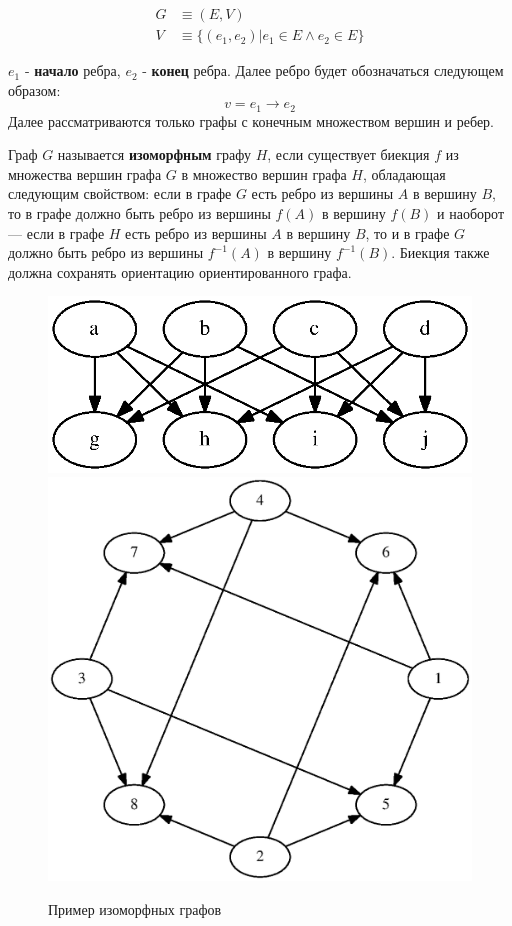 \documentclass[russian,utf8,emptystyle]{eskdtext}
\begin{document}
\begin{spacing}{1.5}
\begin{align*}
G &\equiv ( E, V ) \\ 
V &\equiv \{ (e_1, e_2) | e_1 \in E \wedge e_2 \in E \}
\end{align*}

$e_1$ - \textbf{начало} ребра, $e_2$ - \textbf{конец} ребра. Далее ребро будет обозначаться следующем образом:
$$
v = e_1 \rightarrow e_2
$$
Далее рассматриваются только графы с конечным множеством вершин и ребер.

Граф $G$ называется \textbf{изоморфным} графу $H$, если существует биекция $f$ из множества вершин графа $G$ в множество вершин графа $H$, обладающая следующим свойством: если в графе $G$ есть ребро из вершины $A$ в вершину $B$, то в графе должно быть ребро из вершины $f(A)$ в вершину $f(B)$ и наоборот --- если в графе $H$ есть ребро из вершины $A$ в вершину $B$, то и в графе $G$ должно быть ребро из вершины $f^{-1}(A)$ в вершину $f^{-1}(B)$. Биекция также должна сохранять ориентацию ориентированного графа.

\begin{figure}[h!]
\centering
\includegraphics[scale=0.6]{graphs_isomorph_example_1}
\includegraphics[scale=0.6]{graphs_isomorph_example_2}
\caption{Пример изоморфных графов}
\label{fig:graphs_isomorph_example}
\end{figure}


\end{spacing}
\end{document}
